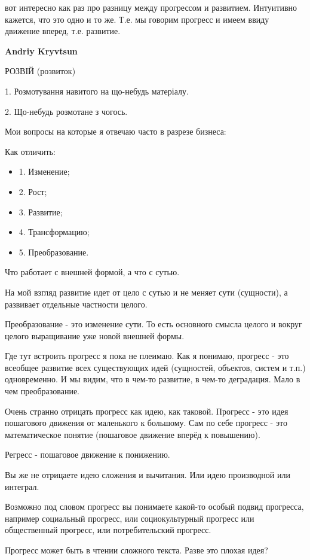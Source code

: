 \begin{itemize}
\begin{itemize}
вот интересно как раз про разницу между прогрессом и развитием. Интуитивно
кажется, что это одно и то же. Т.е. мы говорим прогресс и имеем ввиду движение
вперед, т.е. развитие.


\textbf{Andriy Kryvtsun}

РОЗВІЙ (розвиток)

1. Розмотування навитого на що-небудь матеріалу.

2. Що-небудь розмотане з чогось.

Мои вопросы на которые я отвечаю часто в разрезе бизнеса:

Как отличить:

\begin{itemize} \item 1. Изменение; \item 2. Рост; \item 3. Развитие; \item 4.
Трансформацию; \item 5. Преобразование.  \end{itemize}

Что работает с внешней формой, а что с сутью.

На мой взгляд развитие идет от цело с сутью и не меняет сути (сущности), а
развивает отдельные частности целого.

Преобразование - это изменение сути. То есть основного смысла целого и вокруг
целого выращивание уже новой внешней формы.

Где тут встроить прогресс я пока не плеимаю. Как я понимаю, прогресс - это
всеобщее развитие всех существующих идей (сущностей, объектов, систем и т.п.)
одновременно. И мы видим, что в чем-то развитие, в чем-то деградация. Мало в
чем преобразование.


Очень странно отрицать прогресс как идею, как таковой. Прогресс - это идея
пошагового движения от маленького к большому. Сам по себе прогресс - это
математическое понятие (пошаговое движение вперёд к повышению).

Регресс - пошаговое движение к понижению.

Вы же не отрицаете идею сложения и вычитания. Или идею производной или
интеграл.

Возможно под словом прогресс вы понимаете какой-то особый подвид прогресса,
например социальный прогресс, или социокультурный прогресс или общественный
прогресс, или потребительский прогресс.

Прогресс может быть в чтении сложного текста. Разве это плохая идея?


\end{itemize}
\end{itemize}
